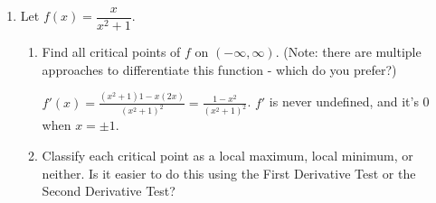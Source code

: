 \documentclass{article}
\begin{document}
\begin{enumerate}
\begin{solution}
\begin{enumerate}[label=\arabic*.]
        To fully answer the problem, we need to determine the value of $h$ that corresponds
        to this value of $r$. Since $h=\frac{2000}{r^2}$, when $r=10$, $h=20$. So the
        dimensions of the can that minimize the amount of steel needed are a radius of $10$
        cm and a height of $20$ cm.
      \end{enumerate}  
  \end{solution}

\item  \label{x/(x^2+1)}

  Let $f(x) = \dfrac{x}{x^2 + 1}$.
  \begin{enumerate}
  \item
    \begin{problem}[\vfill]
      Find all critical points of $f$ on $(-\infty, \infty)$. (Note: there are multiple approaches to differentiate this function - which do you prefer?)
    \end{problem}

    \begin{solution}
      $\displaystyle f'(x) = \frac{(x^2 + 1) 1 - x (2x)}{(x^2 + 1)^2} = \frac{1 - x^2}{(x^2 + 1)^2}$. $f'$ is never undefined, and it's 0 when $x = \boxed{\pm 1}$.
    \end{solution}

  \item
    \begin{problem}[\vfill]
      Classify each critical point as a local maximum, local minimum, or neither. Is it easier to do this using the First Derivative Test or the Second Derivative Test?
    \end{problem}


\end{enumerate}
\end{enumerate}
\end{document}
